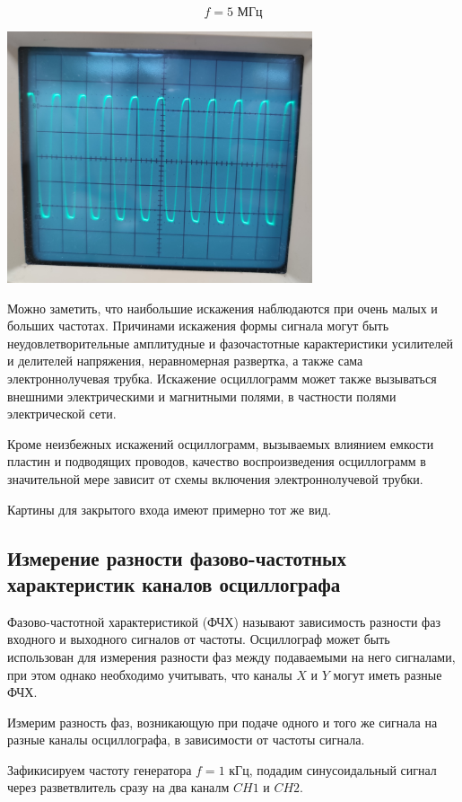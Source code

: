 \documentclass[a4paper, 12pt]{article} %
\begin{document}
\[f = 5 \text{ МГц}\]
\begin{center}
    \includegraphics[width=9cm]{8}
\end{center}

Можно заметить, что наибольшие искажения наблюдаются при очень малых и больших частотах. 
Причинами искажения формы сигнала могут быть неудовлетворительные амплитудные и фазочастотные карактеристики усилителей и делителей напряжения, неравномерная развертка, а также сама электроннолучевая трубка. Искажение осциллограмм может также вызываться внешними электрическими и магнитными полями, в частности полями электрической сети. 

Кроме неизбежных искажений осциллограмм, вызываемых влиянием емкости пластин и подводящих проводов, качество воспроизведения осциллограмм в значительной мере зависит от схемы включения электроннолучевой трубки.

Картины для закрытого входа имеют примерно тот же вид.

\subsection{Измерение разности фазово-частотных характеристик
каналов осциллографа}

Фазово-частотной характеристикой
(ФЧХ) называют зависимость разности фаз входного и выходного
сигналов от частоты. Осциллограф может быть использован для
измерения разности фаз между подаваемыми на него сигналами, при
этом однако необходимо учитывать, что каналы $X$ и $Y$ могут иметь
разные ФЧХ.

Измерим разность фаз, возникающую при подаче одного и того же сигнала на разные каналы осциллографа, в зависимости от частоты сигнала.

Зафикисируем частоту генератора $f = 1$ кГц, подадим синусоидальный сигнал через разветвлитель сразу на два каналм $CH1$ и $CH2$.
\end{document}
